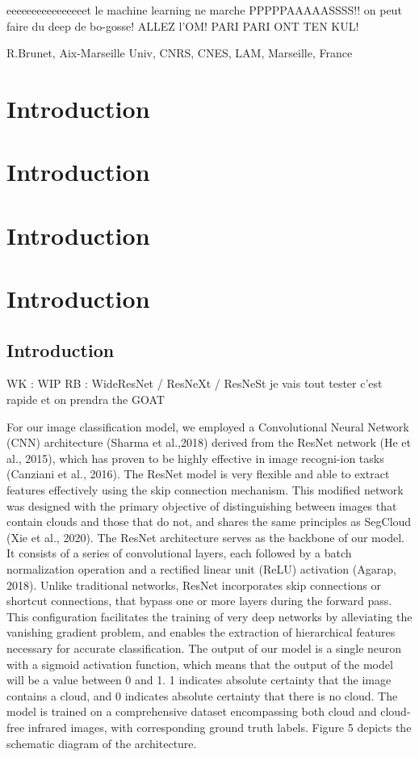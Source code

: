 \documentclass[a4paper,12pt]{article}
\begin{document}
eeeeeeeeeeeeeeeet le machine learning ne marche PPPPPAAAAASSSS!! on peut faire du deep de bo-gosse! ALLEZ l'OM! PARI PARI ONT TEN KUL!

R.Brunet, Aix-Marseille Univ, CNRS, CNES, LAM, Marseille, France


\section{Introduction}
\section{Introduction}
\section{Introduction}
\section{Introduction}
\subsection{Introduction}
WK : WIP
RB : WideResNet / ResNeXt / ResNeSt je vais tout tester
c’est rapide et on prendra the GOAT

For our image classification model, we employed a Convolutional Neural Network (CNN) architecture (Sharma et al.,2018) derived from the ResNet network (He et al., 2015), which has proven to be highly effective in image recogni-ion tasks (Canziani et al., 2016).
The ResNet model is very flexible and able to extract features effectively using the skip connection mechanism.
This modified network was designed with the primary objective of distinguishing between images that contain clouds and those that do not, and shares the same principles as SegCloud (Xie et al., 2020).
The ResNet architecture serves as the backbone of our model.
It consists of a series of convolutional layers, each followed by a batch normalization operation and a rectified linear unit (ReLU) activation (Agarap, 2018).
Unlike traditional networks, ResNet incorporates skip connections or shortcut connections, that bypass one or more layers during the forward pass.
This configuration facilitates the training of very deep networks by alleviating the vanishing gradient problem, and enables the extraction of hierarchical features necessary for accurate classification.
The output of our model is a single neuron with a sigmoid activation function, which means that the output of the model will be a value between 0 and 1.
1 indicates absolute certainty that the image contains a cloud, and 0 indicates absolute certainty that there is no cloud.
The model is trained on a comprehensive dataset encompassing both cloud and cloud-free infrared images, with corresponding ground truth labels.
Figure 5 depicts the schematic diagram of the architecture.
\end{document}
